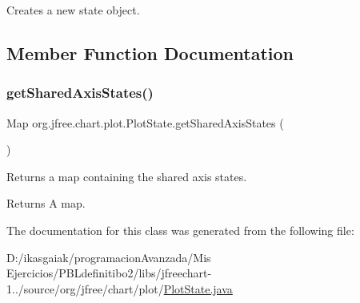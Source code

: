 Creates a new state object. 

\subsection{Member Function Documentation}
\mbox{\label{classorg_1_1jfree_1_1chart_1_1plot_1_1_plot_state_a06c76bb7bd009ee70b42124abd6eb8fe}} 
\subsubsection{\texorpdfstring{get\+Shared\+Axis\+States()}{getSharedAxisStates()}}
{\footnotesize\ttfamily Map org.\+jfree.\+chart.\+plot.\+Plot\+State.\+get\+Shared\+Axis\+States (\begin{DoxyParamCaption}{ }\end{DoxyParamCaption})}

Returns a map containing the shared axis states.

\begin{DoxyReturn}{Returns}
A map. 
\end{DoxyReturn}


The documentation for this class was generated from the following file\+:\begin{DoxyCompactItemize}
\item 
D\+:/ikasgaiak/programacion\+Avanzada/\+Mis Ejercicios/\+P\+B\+Ldefinitibo2/libs/jfreechart-\/1../source/org/jfree/chart/plot/\mbox{\hyperlink{_plot_state_8java}{Plot\+State.\+java}}\end{DoxyCompactItemize}
